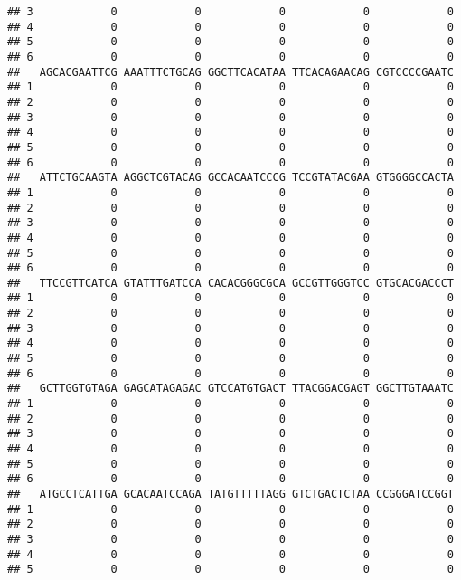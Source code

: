 \documentclass[]{article}
\begin{document}
\begin{verbatim}
## 3            0            0            0            0            0
## 4            0            0            0            0            0
## 5            0            0            0            0            0
## 6            0            0            0            0            0
##   AGCACGAATTCG AAATTTCTGCAG GGCTTCACATAA TTCACAGAACAG CGTCCCCGAATC
## 1            0            0            0            0            0
## 2            0            0            0            0            0
## 3            0            0            0            0            0
## 4            0            0            0            0            0
## 5            0            0            0            0            0
## 6            0            0            0            0            0
##   ATTCTGCAAGTA AGGCTCGTACAG GCCACAATCCCG TCCGTATACGAA GTGGGGCCACTA
## 1            0            0            0            0            0
## 2            0            0            0            0            0
## 3            0            0            0            0            0
## 4            0            0            0            0            0
## 5            0            0            0            0            0
## 6            0            0            0            0            0
##   TTCCGTTCATCA GTATTTGATCCA CACACGGGCGCA GCCGTTGGGTCC GTGCACGACCCT
## 1            0            0            0            0            0
## 2            0            0            0            0            0
## 3            0            0            0            0            0
## 4            0            0            0            0            0
## 5            0            0            0            0            0
## 6            0            0            0            0            0
##   GCTTGGTGTAGA GAGCATAGAGAC GTCCATGTGACT TTACGGACGAGT GGCTTGTAAATC
## 1            0            0            0            0            0
## 2            0            0            0            0            0
## 3            0            0            0            0            0
## 4            0            0            0            0            0
## 5            0            0            0            0            0
## 6            0            0            0            0            0
##   ATGCCTCATTGA GCACAATCCAGA TATGTTTTTAGG GTCTGACTCTAA CCGGGATCCGGT
## 1            0            0            0            0            0
## 2            0            0            0            0            0
## 3            0            0            0            0            0
## 4            0            0            0            0            0
## 5            0            0            0            0            0

\end{verbatim}
\end{document}
